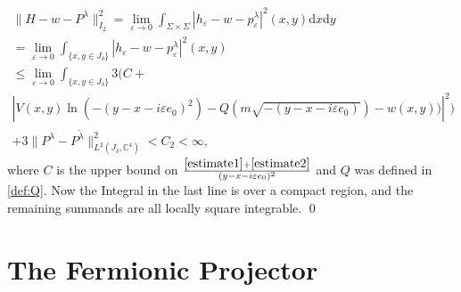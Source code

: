 \documentclass[a4paper,11pt]{article}
\begin{document}
\begin{align}
\|H-w-P^\lambda\|_{I_2}^2
= \lim_{\varepsilon \rightarrow 0}  \int_{\Sigma \times \Sigma}| h_\varepsilon -w - p_\varepsilon^\lambda |^2(x,y) \mathrm{d}x \mathrm{d}y\\
=\lim_{\varepsilon \rightarrow 0}\int_{\{x,y\in J_\delta\}} | h_\varepsilon -w - p_\varepsilon^\lambda |^2(x,y)\\
\le \lim_{\varepsilon \rightarrow 0}\int_{\{x,y\in J_\delta \}} 3(C+ \\
| V(x,y)\ln(-(y-x-i\varepsilon e_0)^2) -Q(m \sqrt{-(y-x-i\varepsilon e_0)}) -w(x,y))  |^2) \\
+3 \|P^\lambda - P^{\tilde{\lambda}}\|_{L^2(J_\delta,\mathbb{C}^4)}^2<C_2<\infty ,
\end{align}
where \(C\) is the upper bound on \(\frac{\eqref{estimate1}+\eqref{estimate2}}{(y-x-i\varepsilon e_0)^2}\) and \(Q\) was defined in \eqref{def:Q}. Now the Integral in the last line is over a compact region, and the remaining summands are all locally square integrable. \qed







\section{The Fermionic Projector}






\end{document}
